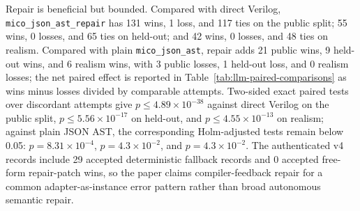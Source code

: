 Repair is beneficial but bounded. Compared with direct Verilog,
\texttt{mico\_json\_ast\_repair} has 131 wins, 1 loss, and 117 ties on the
public split; 55 wins, 0 losses, and 65 ties on held-out; and 42 wins, 0 losses,
and 48 ties on realism. Compared with plain \texttt{mico\_json\_ast}, repair
adds 21 public wins, 9 held-out wins, and 6 realism wins, with 3 public losses,
1 held-out loss, and 0 realism losses; the net paired effect is reported in
Table~\ref{tab:llm-paired-comparisons} as wins minus losses divided by
comparable attempts. Two-sided exact paired tests over discordant attempts give
$p\le 4.89\times10^{-38}$ against direct Verilog on the public split,
$p\le 5.56\times10^{-17}$ on held-out, and $p\le 4.55\times10^{-13}$ on
realism; against plain JSON AST, the corresponding Holm-adjusted tests remain
below 0.05: $p=8.31\times10^{-4}$, $p=4.3\times10^{-2}$, and
$p=4.3\times10^{-2}$. The authenticated v4 records include 29 accepted
deterministic fallback records and 0 accepted free-form repair-patch wins, so
the paper claims compiler-feedback repair for a common adapter-as-instance error
pattern rather than broad autonomous semantic repair.
